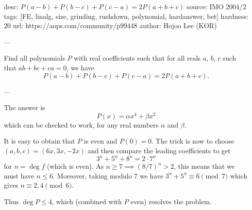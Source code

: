 desc:  $P(a-b) + P(b-c) + P(c-a) = 2 P(a+b+c)$
source:  IMO 2004/2
tags:  [FE, linalg, size, grinding, rushdown, polynomial, hardanswer, bet]
hardness: 20
url: https://aops.com/community/p99448
author: Hojoo Lee (KOR)

---

Find all polynomials $P$ with real coefficients such that
for all reals $a$, $b$, $c$ such that $ab+bc+ca = 0$, we have
\[ P(a-b) + P(b-c) + P(c-a) = 2P(a+b+c). \]

---

The answer is \[ P(x) = \alpha x^4 + \beta x^2 \]
which can be checked to work, for any real numbers $\alpha$ and $\beta$.

It is easy to obtain that $P$ is even and $P(0) = 0$.
The trick is now to choose $(a,b,c) = (6x,3x,-2x)$
and then compare the leading coefficients to get
\[ 3^n + 5^n + 8^n = 2 \cdot 7^n \]
for $n = \deg f$ (which is even).
As $n \ge 7 \implies (8/7)^n > 2$, this means that we must have $n \le 6$.
Moreover, taking modulo $7$ we have $3^n + 5^n \equiv 6 \pmod 7$
which gives $n \equiv 2, 4 \pmod 6$.

Thus $\deg P \le 4$, which (combined with $P$ even) resolves the problem.
